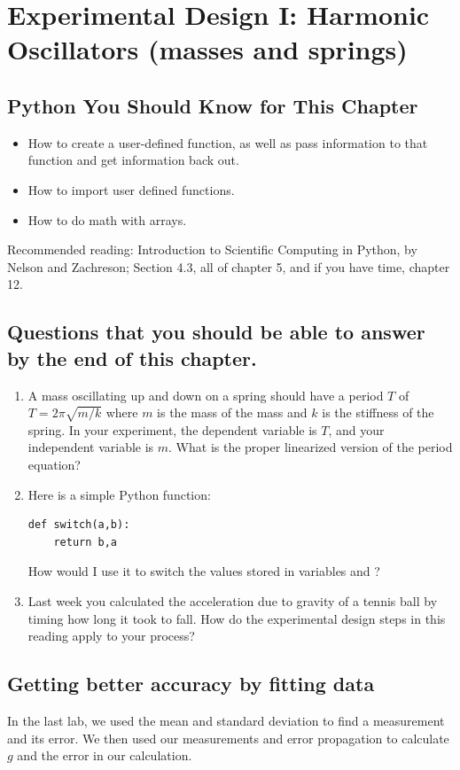 \documentclass[twoside,11pt,ShortChapTitles]{BYUTextbook}
\begin{document}
\chapter[Experimental Design I]{Experimental Design I: Harmonic Oscillators (masses and springs)\label{Experimental Design}}
\section*{Python You Should Know for This Chapter}
\begin{itemize}
\item How to create a user-defined function, as well as pass information to that function and get information back out.
\item How to import user defined functions.
\item How to do math with arrays.
\end{itemize}
Recommended reading: Introduction to Scientific Computing in Python, by Nelson and Zachreson; Section 4.3, all of chapter 5, and if you have time, chapter 12.
\section*{Questions that you should be able to answer by the end of this chapter.}
\begin{enumerate}
\item A mass oscillating up and down on a spring should have a period $T$ of $T=2\pi\sqrt{m/k}$ where $m$ is the mass of the mass and $k$ is the stiffness of the spring.  In your experiment, the dependent variable is $T$, and your independent variable is $m$.  What is the proper linearized version of the period equation?
\item Here is a simple Python function:
\begin{lstlisting}
def switch(a,b):
    return b,a

\end{lstlisting}
How would I use it to switch the values stored in variables  and ?
\item Last week you calculated the acceleration due to gravity of a tennis ball by timing how long it took to fall.  How do the experimental design steps in this reading apply to your process?
\end{enumerate}
\hrulefill


\section{Getting better accuracy by fitting data}
In the last lab, we used the mean and standard deviation to find a measurement and its error.  We then used our measurements and error propagation to calculate $g$ and the error in our calculation.
\end{document}
